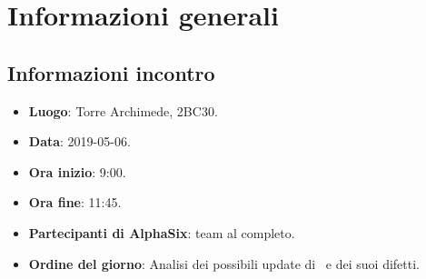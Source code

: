 \newcommand{\documento}{\VI}
\newcommand{\nomedocumentofisico}{VI\_2019-05-06.pdf}
\newcommand{\redazione}{\NC}
\newcommand{\verifica}{\SG}
\newcommand{\approvazione}{\TG}
\newcommand{\versione}{1.0.0}
\newcommand{\uso}{Interno}
\newcommand{\destinateTo}{\gruppo}
\newcommand{\datacreazione}{06 maggio 2019}
\newcommand{\datamodifica}{08 maggio 2019}
\newcommand{\stato}{Approvato}

\def\TABELLE{false}	%
\def\FIGURE{false} 	%






    

    

    \section{Informazioni generali}
		\subsection{Informazioni incontro}
			\begin{itemize}
				\item \textbf{Luogo}: Torre Archimede, 2BC30.
				\item \textbf{Data}: 2019-05-06.
				\item \textbf{Ora inizio}: 9:00.
				\item \textbf{Ora fine}: 11:45.
				\item \textbf{Partecipanti di AlphaSix}: team al completo.
				\item \textbf{Ordine del giorno}: Analisi dei possibili update di \progetto\ e dei suoi difetti.
			\end{itemize}

